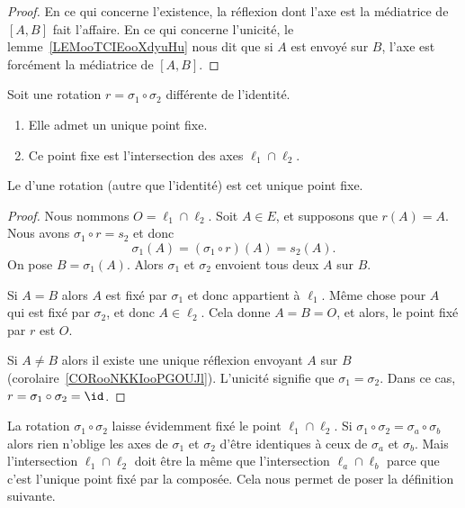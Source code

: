 \begin{proof}
	En ce qui concerne l'existence, la réflexion dont l'axe est la médiatrice de \( [A,B]\) fait l'affaire. En ce qui concerne l'unicité, le lemme~\ref{LEMooTCIEooXdyuHu} nous dit que si \( A\) est envoyé sur \( B\), l'axe est forcément la médiatrice de \( [A,B]\).
\end{proof}

\begin{lemmaDef}        \label{LEMooIJELooLWqBfE}
	Soit une rotation \( r=\sigma_1\circ\sigma_2\) différente de l'identité.
	\begin{enumerate}
		\item
		      Elle admet un unique point fixe.
		\item
		      Ce point fixe est l'intersection des axes \( \ell_1\cap\ell_2\).
	\end{enumerate}

	Le  d'une rotation (autre que l'identité) est cet unique point fixe.
\end{lemmaDef}

\begin{proof}
	Nous nommons \( O=\ell_1\cap\ell_2\). Soit \( A\in E\), et supposons que \( r(A)=A\). Nous avons \( \sigma_1\circ r=s_2\) et donc
	\begin{equation}
		\sigma_1(A)=(\sigma_1\circ r)(A)=s_2(A).
	\end{equation}
	On pose \( B=\sigma_1(A)\). Alors \( \sigma_1\) et \( \sigma_2\) envoient tous deux \( A\) sur \( B\).

	Si \( A=B\) alors \( A\) est fixé par \( \sigma_1\) et donc appartient à \( \ell_1\). Même chose pour \( A\) qui est fixé par \( \sigma_2\), et donc \( A\in\ell_2\). Cela donne \( A=B=O\), et alors, le point fixé par \( r\) est \( O\).

	Si \( A\neq B\) alors il existe une unique réflexion envoyant \( A\) sur \( B\) (corolaire~\ref{CORooNKKIooPGOUJl}). L'unicité signifie que \( \sigma_1=\sigma_2\). Dans ce cas, \( r=\sigma_1\circ\sigma_2=\id\).
\end{proof}

\begin{normaltext}      \label{NORMooDPBOooKkRuTn}
	La rotation \( \sigma_1\circ\sigma_2\) laisse évidemment fixé le point \( \ell_1\cap \ell_2\). Si \( \sigma_1\circ\sigma_2=\sigma_a\circ\sigma_b\) alors rien n'oblige les axes de \( \sigma_1\) et \( \sigma_2\) d'être identiques à ceux de \( \sigma_a\) et \( \sigma_b\). Mais l'intersection \( \ell_1\cap\ell_2\) doit être la même que l'intersection \( \ell_a\cap \ell_b\) parce que c'est l'unique point fixé par la composée. Cela nous permet de poser la définition suivante.
\end{normaltext}

